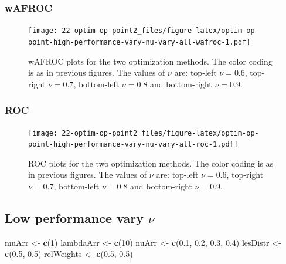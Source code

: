 \documentclass[
]{book}
\newenvironment{Shaded}{\begin{snugshade}}{\end{snugshade}}
\newcommand{\DecValTok}[1]{\textcolor[rgb]{0.00,0.00,0.81}{#1}}
\newcommand{\FloatTok}[1]{\textcolor[rgb]{0.00,0.00,0.81}{#1}}
\newcommand{\KeywordTok}[1]{\textcolor[rgb]{0.13,0.29,0.53}{\textbf{#1}}}
\newcommand{\NormalTok}[1]{#1}
\newcommand{\StringTok}[1]{\textcolor[rgb]{0.31,0.60,0.02}{#1}}
\begin{document}
\hypertarget{wafroc-9}{%
\subsubsection{wAFROC}\label{wafroc-9}}

\begin{figure}
\centering
\texttt{[image: 22-optim-op-point2\_files/figure-latex/optim-op-point-high-performance-vary-nu-vary-all-wafroc-1.pdf]}
\caption{\label{fig:optim-op-point-high-performance-vary-nu-vary-all-wafroc}wAFROC plots for the two optimization methods. The color coding is as in previous figures. The values of \(\nu\) are: top-left \(\nu = 0.6\), top-right \(\nu = 0.7\), bottom-left \(\nu = 0.8\) and bottom-right \(\nu = 0.9\).}
\end{figure}

\hypertarget{roc-9}{%
\subsubsection{ROC}\label{roc-9}}

\begin{figure}
\centering
\texttt{[image: 22-optim-op-point2\_files/figure-latex/optim-op-point-high-performance-vary-nu-vary-all-roc-1.pdf]}
\caption{\label{fig:optim-op-point-high-performance-vary-nu-vary-all-roc}ROC plots for the two optimization methods. The color coding is as in previous figures. The values of \(\nu\) are: top-left \(\nu = 0.6\), top-right \(\nu = 0.7\), bottom-left \(\nu = 0.8\) and bottom-right \(\nu = 0.9\).}
\end{figure}

\hypertarget{optim-op-point-low-performance-vary-nu}{%
\subsection{\texorpdfstring{Low performance vary \(\nu\)}{Low performance vary \textbackslash nu}}\label{optim-op-point-low-performance-vary-nu}}

\begin{Shaded}
\begin{Highlighting}[]
\NormalTok{muArr <-}\StringTok{ }\KeywordTok{c}\NormalTok{(}\DecValTok{1}\NormalTok{)}
\NormalTok{lambdaArr <-}\StringTok{ }\KeywordTok{c}\NormalTok{(}\DecValTok{10}\NormalTok{)}
\NormalTok{nuArr <-}\StringTok{ }\KeywordTok{c}\NormalTok{(}\FloatTok{0.1}\NormalTok{, }\FloatTok{0.2}\NormalTok{, }\FloatTok{0.3}\NormalTok{, }\FloatTok{0.4}\NormalTok{)}
\NormalTok{lesDistr <-}\StringTok{ }\KeywordTok{c}\NormalTok{(}\FloatTok{0.5}\NormalTok{, }\FloatTok{0.5}\NormalTok{)}
\NormalTok{relWeights <-}\StringTok{ }\KeywordTok{c}\NormalTok{(}\FloatTok{0.5}\NormalTok{, }\FloatTok{0.5}\NormalTok{)}
\end{Highlighting}
\end{Shaded}
\end{document}
